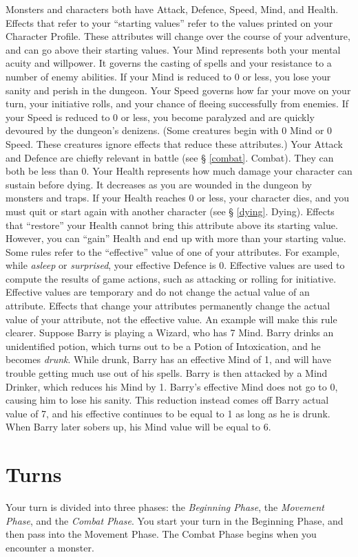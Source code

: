 \documentclass{book}
\begin{document}
Monsters and characters both have Attack, Defence, Speed, Mind, and Health. Effects that refer to your “starting values” refer to the values printed on your Character Profile. These attributes will change over the course of your adventure, and can go above their starting values.
Your Mind represents both your mental acuity and willpower. It governs the casting of spells and your resistance to a number of enemy abilities. If your Mind is reduced to 0 or less, you lose your sanity and perish in the dungeon.
Your Speed governs how far your move on your turn, your initiative rolls, and your chance of fleeing successfully from enemies. If your Speed is reduced to 0 or less, you become paralyzed and are quickly devoured by the dungeon’s denizens. (Some creatures begin with 0 Mind or 0 Speed. These creatures ignore effects that reduce these attributes.)
Your Attack and Defence are chiefly relevant in battle (see § \ref{combat}. Combat). They can both be less than 0.
Your Health represents how much damage your character can sustain before dying. It decreases as you are wounded in the dungeon by monsters and traps. If your Health reaches 0 or less, your character dies, and you must quit or start again with another character (see § \ref{dying}. Dying). Effects that “restore” your Health cannot bring this attribute above its starting value. However, you can “gain” Health and end up with more than your starting value.
Some rules refer to the “effective” value of one of your attributes. For example, while \emph{asleep} or \emph{surprised}, your effective Defence is 0. Effective values are used to compute the results of game actions, such as attacking or rolling for initiative. Effective values are temporary and do not change the actual value of an attribute. Effects that change your attributes permanently change the actual value of your attribute, not the effective value.
An example will make this rule clearer. Suppose Barry is playing a Wizard, who has 7 Mind. Barry drinks an unidentified potion, which turns out to be a Potion of Intoxication, and he becomes \emph{drunk}. While drunk, Barry has an effective Mind of 1, and will have trouble getting much use out of his spells. Barry is then attacked by a Mind Drinker, which reduces his Mind by 1. Barry’s effective Mind does not go to 0, causing him to lose his sanity. This reduction instead comes off Barry actual value of 7, and his effective continues to be equal to 1 as long as he is drunk. When Barry later sobers up, his Mind value will be equal to 6.

\section{Turns}
Your turn is divided into three phases: the \emph{Beginning Phase}, the \emph{Movement Phase}, and the \emph{Combat Phase}. You start your turn in the Beginning Phase, and then pass into the Movement Phase. The Combat Phase begins when you encounter a monster.
\end{document}
